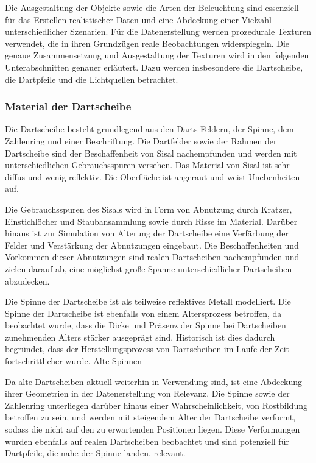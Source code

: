 Die Ausgestaltung der Objekte sowie die Arten der Beleuchtung sind essenziell für das Erstellen realistischer Daten und eine Abdeckung einer Vielzahl unterschiedlicher Szenarien. Für die Datenerstellung werden prozedurale Texturen verwendet, die in ihren Grundzügen reale Beobachtungen widerspiegeln. Die genaue Zusammensetzung und Ausgestaltung der Texturen wird in den folgenden Unterabschnitten genauer erläutert. Dazu werden insbesondere die Dartscheibe, die Dartpfeile und die Lichtquellen betrachtet.

\subsubsection{Material der Dartscheibe}

Die Dartscheibe besteht grundlegend aus den Darts-Feldern, der Spinne, dem Zahlenring und einer Beschriftung. Die Dartfelder sowie der Rahmen der Dartscheibe sind der Beschaffenheit von Sisal nachempfunden und werden mit unterschiedlichen Gebrauchsspuren versehen. Das Material von Sisal ist sehr diffus und wenig reflektiv. Die Oberfläche ist angeraut und weist Unebenheiten auf.

Die Gebrauchsspuren des Sisals wird in Form von Abnutzung durch Kratzer, Einstichlöcher und Staubansammlung sowie durch Risse im Material. Darüber hinaus ist zur Simulation von Alterung der Dartscheibe eine Verfärbung der Felder und Verstärkung der Abnutzungen eingebaut. Die Beschaffenheiten und Vorkommen dieser Abnutzungen sind realen Dartscheiben nachempfunden und zielen darauf ab, eine möglichst große Spanne unterschiedlicher Dartscheiben abzudecken.

Die Spinne der Dartscheibe ist als teilweise reflektives Metall modelliert. Die Spinne der Dartscheibe ist ebenfalls von einem Altersprozess betroffen, da beobachtet wurde, dass die Dicke und Präsenz der Spinne bei Dartscheiben zunehmenden Alters stärker ausgeprägt sind. Historisch ist dies dadurch begründet, dass der Herstellungsprozess von Dartscheiben im Laufe der Zeit fortschrittlicher wurde. Alte Spinnen

Da alte Dartscheiben aktuell weiterhin in Verwendung sind, ist eine Abdeckung ihrer Geometrien in der Datenerstellung von Relevanz. Die Spinne sowie der Zahlenring unterliegen darüber hinaus einer Wahrscheinlichkeit, von Rostbildung betroffen zu sein, und werden mit steigendem Alter der Dartscheibe verformt, sodass die nicht auf den zu erwartenden Positionen liegen. Diese Verformungen wurden ebenfalls auf realen Dartscheiben beobachtet und sind potenziell für Dartpfeile, die nahe der Spinne landen, relevant.

